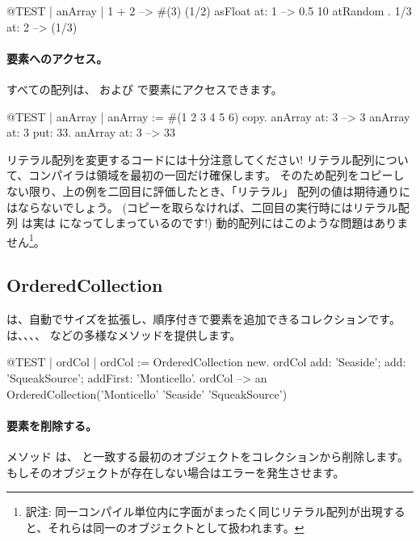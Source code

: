 \documentclass[a4paper,10pt,twoside]{book}
\begin{document}
\begin{code}{@TEST | anArray |}
{ 1 + 2 } --> #(3)
{(1/2) asFloat} at: 1 --> 0.5
{10 atRandom . 1/3} at: 2 --> (1/3)
\end{code}

\paragraph{要素へのアクセス。}
すべての配列は、 および  で要素にアクセスできます。%

\begin{code}{@TEST | anArray |}
anArray := #(1 2 3 4 5 6) copy.
anArray at: 3 --> 3
anArray at: 3 put: 33.
anArray at: 3 --> 33
\end{code}

\noindent
リテラル配列を変更するコードには十分注意してください!
リテラル配列について、コンパイラは領域を最初の一回だけ確保します。
そのため配列をコピーしない限り、上の例を二回目に評価したとき、「リテラル」 配列の値は期待通りにはならないでしょう。
(コピーを取らなければ、二回目の実行時にはリテラル配列  は実は  になってしまっているのです!)
動的配列にはこのような問題はありません\footnote{訳注: 同一コンパイル単位内に字面がまったく同じリテラル配列が出現すると、それらは同一のオブジェクトとして扱われます。}。

\subsection{OrderedCollection}
 は、自動でサイズを拡張し、順序付きで要素を追加できるコレクションです。 は、、、、 などの多様なメソッドを提供します。

\begin{code}{@TEST | ordCol |}
ordCol := OrderedCollection new.
ordCol add: 'Seaside'; add: 'SqueakSource'; addFirst: 'Monticello'.
ordCol --> an OrderedCollection('Monticello' 'Seaside' 'SqueakSource')
\end{code}

\paragraph{要素を削除する。} メソッド   は、 と一致する最初のオブジェクトをコレクションから削除します。もしそのオブジェクトが存在しない場合はエラーを発生させます。
\end{document}
